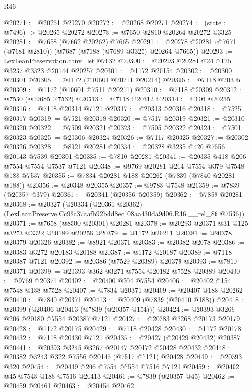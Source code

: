 \begin{lexlean}{R46}
\begin{coremodule}
@20271 := @20261 @20270
@20272 := @20268 @20271
@20274 := (state : @7496) -> @20265 @20272
@20278 := @7650 @2810 @20264 @20272 @3325
@20281 := @7658 (@7662 @20262) @7665
@20291 := @20278 @20281 (@7671 (@7681 @2810)) (@7687 (@7688 (@7689 @3325) @20264 @7665))
@20293 := LexLeanPreservation.conv_let @7632
@20300 := @20293 @20281 @24 @125 @3237 @3323 @20144 @20257
@20301 := @1172 @20154
@20302 := @20300 @20301
@20305 := @1172 (@10601 @20211 @20214)
@20306 := @7118 @20305
@20309 := @1172 (@10601 @7511 @20211)
@20310 := @7118 @20309
@20312 := @7530 (@19685 @7532)
@20313 := @7118 @20312
@20314 := @606 @20235
@20316 := @7118 @20314 @7121
@20317 := @20313 @20316
@20318 := @7525 @20317
@20319 := @7521 @20318
@20320 := @7517 @20319
@20321 := @20310 @20320
@20322 := @7509 @20321
@20323 := @7505 @20322
@20324 := @7501 @20323
@20325 := @20306 @20324
@20326 := @7117 @20325
@20327 := @20302 @20326
@20328 := @8921 @20281
@20334 := @20328 @3235 @420 @7556 @20143 @7539 @20301
@20335 := @7810 @20281
@20341 := @20335 @418 @206 @7554 @7554 @7537 @7121
@20348 := @9769 @20281 @204 @7554 @379 @7548 @188 @7537
@20355 := @7834 @20281 @188 @20262 (@7839 (@7840 @20281 @188))
@20356 := @20348 @20355
@20357 := @9788 @7548
@20359 := @7839 (@20357 @379)
@20361 := @20341 (@20356 @20359)
@20362 := @7859 @20281
@20368 := @20327
    (@20334 (@20361 @20362) (LexLeanPreserve.Cc98c37aafb92bdd8ec108aa430da9d06.R46.__rel_86 @7536))
@20371 := @7658 (@8500 @20301) @20281
@20378 := @20293 @20371 @31 @125 @3273 @3322 @20189 @20256
@20379 := @1172 @20211
@20381 := @20378 @20379 @20326
@20382 := @8921 @20371
@20383 := @20382 @2078
@20386 := @20383 @3272 @20183 @20188
@20387 := @1172 @20187
@20389 := @7118 @20387 @7121
@20392 := @20386 (@7529 @20389) @20379
@20393 := @7810 @20371
@20399 := @20393 @362 @3271 @7554 @20182 @7528 @20389
@20400 := @9769 @20371
@20402 := @20400 @204 @7554
@20406 := @20402 @154 @7548 @188 @7528
@20407 := @7834 @20371
@20409 := @20407 @188 @20262
@20410 := @7840 @20371
@20413 := @20409 (@7839 (@20410 @188))
@20418 := @20399 (@20406 @20413 (@7839 (@20357 @154)))
@20424 := @20393 @3269 @206 @20180 @7554 @20387 @7121
@20427 := @20383 @3268 @20173 @20179
@20428 := @1172 @20175
@20429 := @7118 @20428
@20430 := @1172 @20178
@20432 := @7118 @20430 @7121
@20435 := @20427 (@20429 @20432) @20387
@20441 := @20393 @3245 @3267 @20147 @20172 @20428 @20432
@20448 := @20382 @3243 @322 @7556 @20146 (@7517 @7121) @20428
@20449 := @20393 @320
@20454 := @20449 @206 @7554 @7554 @7516 @7121
@20459 := @20402 @45 @7548 @188 @7516 @20413
@20461 := @7839 (@20357 @45)
@20462 := @20459 @20461
@20463 := @20454 @20462

\end{coremodule}
\end{lexlean}
